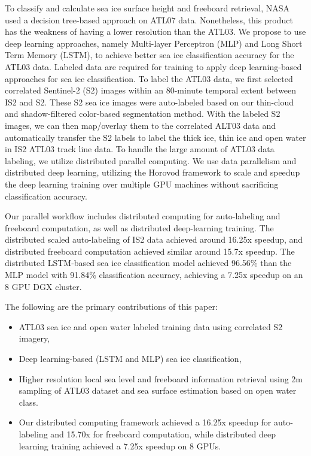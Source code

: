 To classify and calculate sea ice surface height and freeboard retrieval, NASA used a decision tree-based approach \cite{kwok2020icesat} on ATL07 data. Nonetheless, this product has the weakness of having a lower resolution than the ATL03.
We propose to use deep learning approaches, namely Multi-layer Perceptron (MLP) and Long Short Term Memory (LSTM), to achieve better sea ice classification accuracy for the ATL03 data. 
Labeled data are required for training to apply deep learning-based approaches for sea ice classification. To label the ATL03 data, we first selected correlated Sentinel-2 (S2) \cite{drusch2012sentinel} images within an 80-minute temporal extent between IS2 and S2. These S2 sea ice images were auto-labeled based on our thin-cloud and shadow-filtered color-based segmentation method\cite{iqrah2023toward}. With the labeled S2 images, we can then map/overlay them to the correlated ALT03 data and automatically transfer the S2 labels to label the thick ice, thin ice and open water in IS2 ATL03 track line data. 
To handle the large amount of ATL03 data labeling, we utilize distributed parallel computing. We use data parallelism and distributed deep learning, utilizing the Horovod framework \cite{sergeev2018horovod} to scale and speedup the deep learning training over multiple GPU machines without sacrificing classification accuracy.

Our parallel workflow includes distributed computing for auto-labeling and freeboard computation, as well as distributed deep-learning training. The distributed scaled auto-labeling of IS2 data achieved around 16.25x speedup, and distributed freeboard computation achieved similar around 15.7x speedup. The distributed LSTM-based sea ice classification model achieved 96.56\% than the MLP model with 91.84\% classification accuracy, achieving a 7.25x speedup on an 8 GPU DGX cluster.

The following are the primary contributions of this paper:
\begin{itemize}
    \item ATL03 sea ice and open water labeled training data using correlated S2 imagery,
    \item Deep learning-based (LSTM and MLP) sea ice classification,
    \item Higher resolution local sea level and freeboard information retrieval using 2m sampling of ATL03 dataset and sea surface estimation based on open water class.
    \item Our distributed computing framework achieved a 16.25x speedup for auto-labeling and 15.70x for freeboard computation, while distributed deep learning training achieved a 7.25x speedup on 8 GPUs.
\end{itemize}


